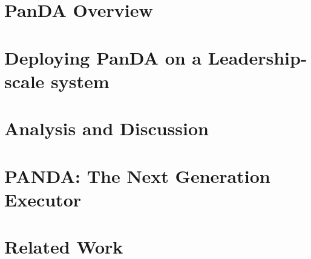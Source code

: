 \documentclass[sigconf, screen]{acmart}
\begin{document}
\section{PanDA Overview}
\label{sec:panda_overview}




\section{Deploying PanDA on a Leadership-scale system}
\label{sec:panda_deployment}




\section{Analysis and Discussion}
\label{sec:panda_titan}




\section{PANDA\@: The Next Generation Executor}
\label{sec:panda_roadmap}





\section{Related Work}
\label{sec:related}

% 

\end{document}
